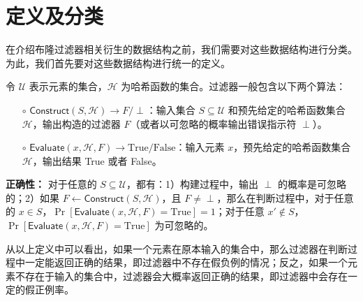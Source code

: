 
\section{定义及分类}\label{sec:defi_cate}

在介绍布隆过滤器相关衍生的数据结构之前，我们需要对这些数据结构进行分类。
为此，我们首先要对这些数据结构进行统一的定义。

\begin{definition}[过滤器]\label{def:filter}
    令 $\mathcal{U}$ 表示元素的集合，$\mathcal{H}$ 为哈希函数的集合。过滤器一般包含以下两个算法：
    \begin{itemize}
    \item[$\circ$] $\mathsf{Construct}(S, \mathcal{H}) \to F/\perp$：输入集合 $S \subseteq \mathcal{U}$ 和预先给定的哈希函数集合 $\mathcal{H}$，输出构造的过滤器 $F$（或者以可忽略的概率输出错误指示符 $\perp$）。
    \item[$\circ$] $\mathsf{Evaluate}(x, \mathcal{H}, F) \to \mbox{True}/\mbox{False} $：输入元素 $x$，预先给定的哈希函数集合 $\mathcal{H}$，输出结果 True 或者 False。
    \end{itemize}

    \textbf{正确性：} 对于任意的 $S \subseteq \mathcal{U}$，都有：1）构建过程中，输出 $\perp$ 的概率是可忽略的；2）如果 $F \gets \mathsf{Construct}(S, \mathcal{H})$，且 $F \neq \perp$，那么在判断过程中，对于任意的 $x \in S$，$\Pr[\mathsf{Evaluate}(x, \mathcal{H}, F) = \mbox{True}] = 1$；对于任意 $x' \notin S$，$\Pr[\mathsf{Evaluate}(x, \mathcal{H}, F) = \mbox{True}]$ 为可忽略的。
\end{definition}
从以上定义中可以看出，如果一个元素在原本输入的集合中，那么过滤器在判断过程中一定能返回正确的结果，即过滤器中不存在假负例的情况；反之，如果一个元素不存在于输入的集合中，过滤器会大概率返回正确的结果，即过滤器中会存在一定的假正例率。

